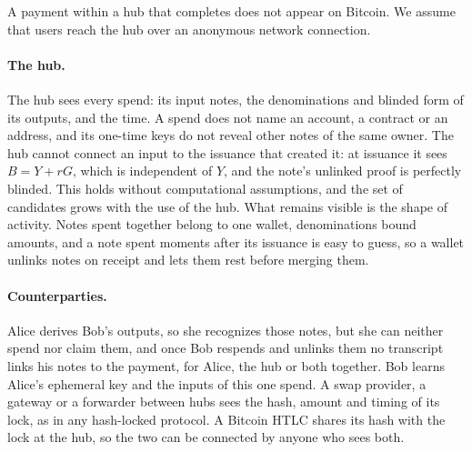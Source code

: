 \documentclass[11pt]{article}
\makeatletter
\renewcommand\section{\@startsection{section}{1}{\z@}{-2.5ex plus -1ex minus -.2ex}{1.2ex plus .2ex}{\large\bfseries}}
\makeatother
\begin{document}
\section{Privacy}
\label{sec:privacy}

A payment within a hub that completes does not appear on Bitcoin. We assume that users reach the hub over an anonymous network connection.

\paragraph{The hub.} The hub sees every spend: its input notes, the denominations and blinded form of its outputs, and the time. A spend does not name an account, a contract or an address, and its one-time keys do not reveal other notes of the same owner. The hub cannot connect an input to the issuance that created it: at issuance it sees $B=Y+rG$, which is independent of $Y$, and the note's unlinked proof is perfectly blinded. This holds without computational assumptions, and the set of candidates grows with the use of the hub. What remains visible is the shape of activity. Notes spent together belong to one wallet, denominations bound amounts, and a note spent moments after its issuance is easy to guess, so a wallet unlinks notes on receipt and lets them rest before merging them.

\paragraph{Counterparties.} Alice derives Bob's outputs, so she recognizes those notes, but she can neither spend nor claim them, and once Bob respends and unlinks them no transcript links his notes to the payment, for Alice, the hub or both together. Bob learns Alice's ephemeral key and the inputs of this one spend. A swap provider, a gateway or a forwarder between hubs sees the hash, amount and timing of its lock, as in any hash-locked protocol. A Bitcoin HTLC shares its hash with the lock at the hub, so the two can be connected by anyone who sees both.
\end{document}
